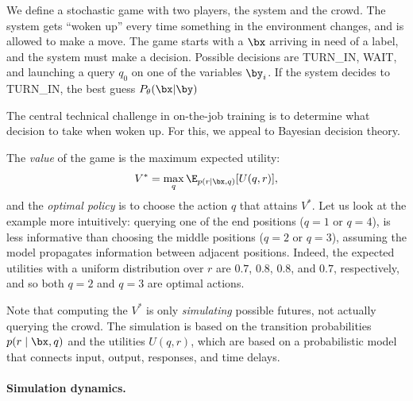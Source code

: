 We define a stochastic game with two players, the system and the crowd.
The system gets ``woken up'' every time something in the environment changes, and is allowed to make a move.
The game starts with a $\bx$ arriving in need of a label, and the system must make a decision.
Possible decisions are TURN\_IN, WAIT, and launching a query $q_0$ on one of the variables $\by_i$.
If the system decides to TURN\_IN, the best guess $P_{\theta}(\bx|\by)$

The central technical challenge in on-the-job training
is to determine what decision to take when woken up. For this, we appeal to Bayesian decision theory.

The \emph{value} of the game is the maximum expected utility:
\begin{align}
  V^* = \max_q \E_{p(r \mid \bx, q)}[U(q, r)],
\end{align}
and the \emph{optimal policy} is to choose the action $q$ that attains $V^*$.
Let us look at the example more intuitively:
querying one of the end positions ($q = 1$ or $q = 4$),
is less informative than choosing the middle positions ($q = 2$ or $q = 3$),
assuming the model propagates information between adjacent positions.
Indeed, the expected utilities with a uniform distribution over $r$
are $0.7$, $0.8$, $0.8$, and $0.7$, respectively, and so both $q = 2$ and $q = 3$ are optimal actions.

Note that computing the $V^*$ is only \emph{simulating} possible futures,
not actually querying the crowd.  The simulation is based on the transition
probabilities $p(r \mid \bx, q)$ and the utilities $U(q, r)$, which are
based on a probabilistic model that connects input, output, responses, and time delays.

\paragraph{Simulation dynamics.}

